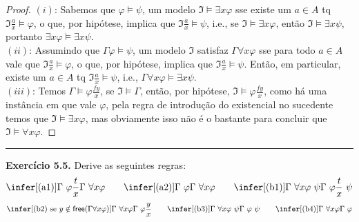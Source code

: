\documentclass[11pt]{article}
\theoremstyle{definition}
\newcommand{\mf}[1]{\mathfrak{#1}}
\newcommand{\msf}[1]{\mathsf{#1}}
\begin{document}
\begin{proof}
    $(i)$: Sabemos que $\varphi\vDash\psi$, um modelo $\mf{I}\vDash\exists x\varphi$ sse existe um $a\in A$ tq $\mf{I}\frac{a}{x}\vDash\varphi$, o que, por hipótese, implica que $\mf{I}\frac{a}{x}\vDash\psi$, i.e., se $\mf{I}\vDash\exists x\varphi$, então $\mf{I}\vDash\exists x\psi$, portanto $\exists x\varphi\vDash\exists x\psi$.\\
    $(ii)$: Assumindo que $\Gamma\varphi\vDash\psi$, um modelo $\mf{I}$ satisfaz $\Gamma\forall x\varphi$ sse para todo $a\in A$ vale que $\mf{I}\frac{a}{x}\vDash\varphi$, o que, por hipótese, implica que $\mf{I}\frac{a}{x}\vDash\psi$. Então, em particular, existe um $a\in A$ tq $\mf{I}\frac{a}{x}\vDash\psi$, i.e., $\Gamma\forall x\varphi\vDash\exists x\psi$.\\
    $(iii)$: Temos $\Gamma\vDash\varphi\frac{fy}{x}$, se $\mf{I}\vDash\Gamma$, então, por hipótese, $\mf{I}\vDash\varphi\frac{fy}{x}$, como há uma instância em que vale $\varphi$, pela regra de introdução do existencial no sucedente temos que $\mf{I}\vDash\exists x\varphi$, mas obviamente isso não é o bastante para concluir que $\mf{I}\vDash\forall x\varphi$.
\end{proof}

\hrule

\textbf{Exercício 5.5.} Derive as seguintes regras:
$$\infer[(\text{a1})]{\Gamma~\varphi\frac{t}{x}}{\Gamma~\forall x\varphi}~~~~~~\infer[(\text{a2})]{\Gamma~\varphi}{\Gamma~\forall x\varphi}~~~~~~\infer[(\text{b1})]{\Gamma~\forall x\varphi~\psi}{\Gamma~\varphi\frac{t}{x}~\psi}$$
$$\infer[(\text{b2})\text{ se }y\notin\msf{free}(\Gamma\forall x\varphi)]{\Gamma~\forall x\varphi}{\Gamma~\varphi\frac{y}{x}}~~~~~~\infer[(\text{b3})]{\Gamma~\forall x\varphi~\psi}{\Gamma~\varphi~\psi}~~~~~~\infer[(\text{b4})]{\Gamma~\forall x\varphi}{\Gamma~\varphi}$$
\end{document}
